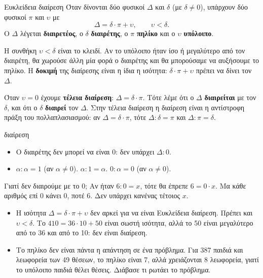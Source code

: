 
\begin{orismos}{Ευκλείδεια διαίρεση}
Όταν δίνονται δύο φυσικοί $\Delta$ και $\delta$ (με $\delta\neq 0$), υπάρχουν δύο φυσικοί $\pi$ και $\upsilon$ με
$$\Delta=\delta\cdot\pi+\upsilon,\qquad \upsilon<\delta.$$
Ο $\Delta$ λέγεται \textbf{διαιρετέος}, ο $\delta$ \textbf{διαιρέτης}, ο $\pi$ \textbf{πηλίκο} και ο $\upsilon$ \textbf{υπόλοιπο}.
\end{orismos}

Η συνθήκη $\upsilon<\delta$ είναι το κλειδί. Αν το υπόλοιπο ήταν ίσο ή μεγαλύτερο από τον διαιρέτη, θα χωρούσε άλλη μία φορά ο διαιρέτης και θα μπορούσαμε να αυξήσουμε το πηλίκο. Η \textbf{δοκιμή} της διαίρεσης είναι η ίδια η ισότητα: $\delta\cdot\pi+\upsilon$ πρέπει να δίνει τον $\Delta$.

Όταν $\upsilon=0$ έχουμε \textbf{τέλεια διαίρεση}: $\Delta=\delta\cdot\pi$. Τότε λέμε ότι ο $\Delta$ \textbf{διαιρείται} με τον $\delta$, και ότι ο $\delta$ \textbf{διαιρεί} τον $\Delta$. Στην τέλεια διαίρεση η διαίρεση είναι η αντίστροφη πράξη του πολλαπλασιασμού: αν $\Delta=\delta\cdot\pi$, τότε $\Delta:\delta=\pi$ και $\Delta:\pi=\delta$.

\begin{idiotita}{διαίρεση}
\begin{itemize}[leftmargin=1.2em,itemsep=0.2ex,topsep=2pt]
\item Ο διαιρέτης δεν μπορεί να είναι 0: δεν υπάρχει $\Delta:0$.
\item $\alpha:\alpha=1$ (αν $\alpha\neq 0$). \quad $\alpha:1=\alpha$. \quad $0:\alpha=0$ (αν $\alpha\neq 0$).
\end{itemize}
\end{idiotita}

Γιατί δεν διαιρούμε με το 0; Αν ήταν $6:0=x$, τότε θα έπρεπε $6=0\cdot x$. Μα κάθε αριθμός επί 0 κάνει 0, ποτέ 6. Δεν υπάρχει κανένας τέτοιος $x$.

\begin{prosoxi}
\begin{itemize}[leftmargin=1.2em,itemsep=0.3ex,topsep=2pt]
\item Η ισότητα $\Delta=\delta\cdot\pi+\upsilon$ δεν αρκεί για να είναι Ευκλείδεια διαίρεση. Πρέπει και $\upsilon<\delta$. Το $410=36\cdot 10+50$ είναι σωστή ισότητα, αλλά το 50 είναι μεγαλύτερο από το 36 και από το 10: δεν είναι διαίρεση.
\item Το πηλίκο δεν είναι πάντα η απάντηση σε ένα πρόβλημα. Για 387 παιδιά και λεωφορεία των 49 θέσεων, το πηλίκο είναι 7, αλλά χρειάζονται 8 λεωφορεία, γιατί το υπόλοιπο παιδιά θέλει θέσεις. Διάβασε τι ρωτάει το πρόβλημα.
\end{itemize}
\end{prosoxi}

